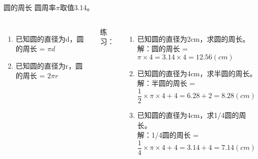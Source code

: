 \documentclass[aspectratio=169]{ctexbeamer} %
\date{\today}
\begin{document}
\begin{frame}[t]{圆的周长}
圆周率$\pi$取值3.14。
\begin{columns}
\begin{enumerate}[label={\arabic*.}]
\item 已知圆的直径为d，\alert{圆的周长 = $\pi d$}
\item 已知圆的直径为r，\alert{圆的周长 = $2\pi r$}
\end{enumerate}
练习：
\begin{enumerate}[label={\arabic*.}]
\item 已知圆的直径为2cm，求圆的周长。\\
\pause
解：圆的周长 = $\pi \times 4 = 3.14 \times 4 = 12.56(cm)$
\item 已知圆的直径为4cm，求半圆的周长。\\
\pause
解：半圆的周长 = $\dfrac{1}{2} \times \pi \times 4 + 4= 6.28 + 2 = 8.28(cm)$
\item 已知圆的直径为4cm，求1/4圆的周长。\\
\pause
解：1/4圆的周长 = $\dfrac{1}{4} \times \pi \times 4 + 4= 3.14 + 4 = 7.14(cm)$
\end{enumerate}
\end{columns}
\end{frame}

\end{document}

